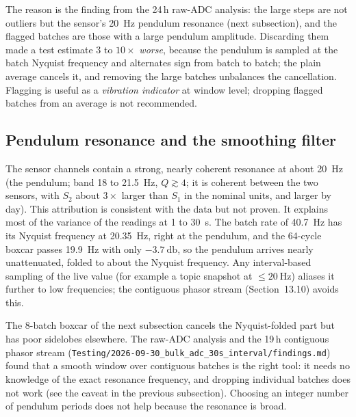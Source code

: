 \documentclass[11pt,a4paper]{article}
\begin{document}
The reason is the finding from the 24\,h raw-ADC analysis: the large steps are
not outliers but the sensor's \SI{20}{\hertz} pendulum resonance (next
subsection), and the flagged batches are those with a large pendulum amplitude.
Discarding them made a test estimate $3$ to $10\times$ \emph{worse}, because
the pendulum is sampled at the batch Nyquist frequency and alternates sign from
batch to batch; the plain average cancels it, and removing the large batches
unbalances the cancellation.  Flagging is useful as a \emph{vibration
indicator} at window level; dropping flagged batches from an average is not
recommended.

\subsection{Pendulum resonance and the smoothing filter}

The sensor channels contain a strong, nearly coherent resonance at about
\SI{20}{\hertz} (the pendulum; band 18 to \SI{21.5}{\hertz}, $Q\gtrsim4$; it
is coherent between the two sensors, with $S_2$ about $3\times$ larger than
$S_1$ in the nominal units, and larger by day).  This attribution is
consistent with the data but not proven.  It explains most of the variance of
the readings at 1 to \SI{30}{\second}.  The batch rate of \SI{40.7}{\hertz} has
its Nyquist frequency at \SI{20.35}{\hertz}, right at the pendulum, and the
64-cycle boxcar passes \SI{19.9}{\hertz} with only $\SI{-3.7}{\decibel}$, so
the pendulum arrives nearly unattenuated, folded to about the Nyquist
frequency.  Any interval-based sampling of the live value (for example
a topic snapshot at $\le\SI{20}{\hertz}$) aliases it further to low
frequencies; the contiguous phasor stream (Section~13.10) avoids this.

The 8-batch boxcar of the next subsection cancels the Nyquist-folded part but
has poor sidelobes elsewhere.  The raw-ADC analysis and the 19\,h contiguous
phasor stream (\nolinkurl{Testing/2026-09-30_bulk_adc_30s_interval/findings.md})
found that a smooth window over contiguous batches is the right tool: it
needs no knowledge of the exact resonance frequency, and dropping individual
batches does not work (see the caveat in the previous subsection).  Choosing an integer number
of pendulum periods does not help because the resonance is broad.
\end{document}

